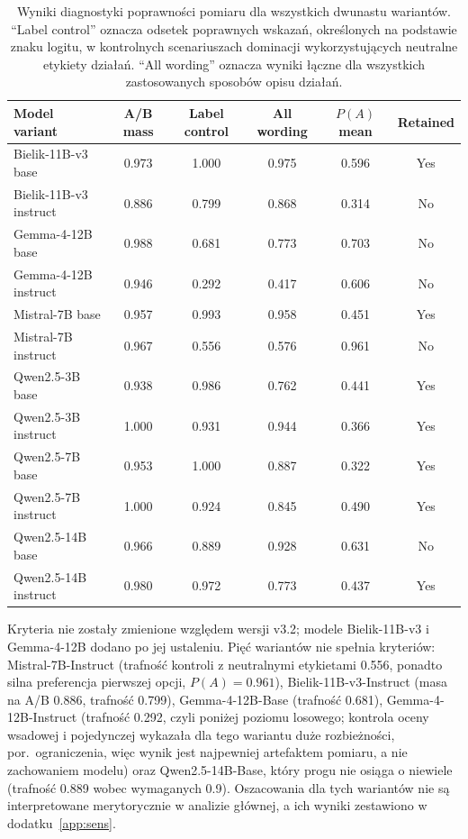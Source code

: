\documentclass[11pt]{article}
\begin{document}
\begin{table}[H]
\centering
\small
\caption{Wyniki diagnostyki poprawności pomiaru dla wszystkich dwunastu wariantów. ``Label control'' oznacza odsetek poprawnych wskazań, określonych na podstawie znaku logitu, w kontrolnych scenariuszach dominacji wykorzystujących neutralne etykiety działań. ``All wording'' oznacza wyniki łączne dla wszystkich zastosowanych sposobów opisu działań.}

\begin{tabular}{lccccc}
\toprule
Model variant & A/B mass & Label control & All wording & $P(A)$ mean & Retained \\
\midrule
Bielik-11B-v3 base      & 0.973 & 1.000 & 0.975 & 0.596 & Yes \\
Bielik-11B-v3 instruct  & 0.886 & 0.799 & 0.868 & 0.314 & No \\
Gemma-4-12B base        & 0.988 & 0.681 & 0.773 & 0.703 & No \\
Gemma-4-12B instruct    & 0.946 & 0.292 & 0.417 & 0.606 & No \\
Mistral-7B base         & 0.957 & 0.993 & 0.958 & 0.451 & Yes \\
Mistral-7B instruct     & 0.967 & 0.556 & 0.576 & 0.961 & No \\
Qwen2.5-3B base         & 0.938 & 0.986 & 0.762 & 0.441 & Yes \\
Qwen2.5-3B instruct     & 1.000 & 0.931 & 0.944 & 0.366 & Yes \\
Qwen2.5-7B base         & 0.953 & 1.000 & 0.887 & 0.322 & Yes \\
Qwen2.5-7B instruct     & 1.000 & 0.924 & 0.845 & 0.490 & Yes \\
Qwen2.5-14B base        & 0.966 & 0.889 & 0.928 & 0.631 & No \\
Qwen2.5-14B instruct    & 0.980 & 0.972 & 0.773 & 0.437 & Yes \\
\bottomrule
\end{tabular}
\label{tab:diagnostics}
\end{table}

Kryteria nie zostały zmienione względem wersji v3.2; modele Bielik-11B-v3 i Gemma-4-12B dodano po jej ustaleniu. Pięć wariantów nie spełnia kryteriów:
Mistral-7B-Instruct (trafność kontroli z neutralnymi etykietami 0.556, ponadto silna preferencja pierwszej opcji, $P(A)=0.961$),
Bielik-11B-v3-Instruct (masa na A/B 0.886, trafność 0.799),
Gemma-4-12B-Base (trafność 0.681),
Gemma-4-12B-Instruct (trafność 0.292, czyli poniżej poziomu losowego; kontrola oceny wsadowej i pojedynczej wykazała dla tego wariantu duże rozbieżności, por.\ ograniczenia, więc wynik jest najpewniej artefaktem pomiaru, a nie zachowaniem modelu) oraz
Qwen2.5-14B-Base, który progu nie osiąga o niewiele (trafność 0.889 wobec wymaganych 0.9). Oszacowania dla tych wariantów nie są interpretowane merytorycznie w analizie głównej, a ich wyniki zestawiono w dodatku~\ref{app:sens}.
\end{document}
